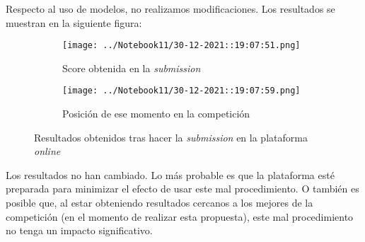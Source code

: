 \documentclass[11pt]{article}
\begin{document}
Respecto al uso de modelos, no realizamos modificaciones. Los resultados se muestran en la siguiente figura:

\begin{figure}[H]
    \centering

    \begin{subfigure}[b]{0.45 \textwidth}
        \texttt{[image: ../Notebook11/30-12-2021::19:07:51.png]}
        \caption{Score obtenida en la \emph{submission}}
    \end{subfigure}
    \begin{subfigure}[b]{0.45 \textwidth}
        \texttt{[image: ../Notebook11/30-12-2021::19:07:59.png]}
        \caption{Posición de ese momento en la competición}
    \end{subfigure}

    \caption{Resultados obtenidos tras hacer la \emph{submission} en la plataforma \emph{online}}
\end{figure}

Los resultados no han cambiado. Lo más probable es que la plataforma esté preparada para minimizar el efecto de usar este mal procedimiento. O también es posible que, al estar obteniendo resultados cercanos a los mejores de la competición (en el momento de realizar esta propuesta), este mal procedimiento no tenga un impacto significativo.

\pagebreak




\end{document}
